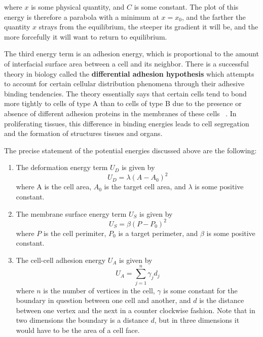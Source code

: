 where $x$ is some physical quantity, and $C$ is some constant. The plot of this energy is therefore a parabola with a minimum at $x =  x_0$, and the farther the quantity $x$ strays from the equilibrium, the steeper its gradient it will be, and the more forcefully it will want to return to equilibrium.

The third energy term is an adhesion energy, which is proportional to the amount of interfacial surface area between a cell and its neighbor. There is a successful theory in biology called the \textbf{differential adhesion hypothesis} which attempts to account for certain cellular distribution phenomena through their adhesive binding tendencies. The theory essentially says that certain cells tend to bond more tightly to cells of type A than to cells of type B due to the presence or absence of different adhesion proteins in the membranes of these cells ~\cite{DA}. In proliferating tissues, this difference in binding energies leads to cell segregation and the formation of structures tissues and organs. 

The precise statement of the potential energies discussed above are the following:

\begin{enumerate}
\item The deformation energy term $U_D$ is given by \\ 
\begin{equation}
U_D = \lambda(A - A_0)^2
\end{equation}
 where A is the cell area, $A_0$ is the target cell area, and $\lambda$ is some positive constant.
\item The membrane surface energy term $U_S$ is given by
\begin{equation}
U_S = \beta(P - P_0)^2
\end{equation}
 where $P$ is the cell perimiter, $P_0$ is a target perimeter, and $\beta$ is some positive constant.
\item The cell-cell adhesion energy $U_A$ is given by
\begin{equation}U_A = \displaystyle\sum\limits_{j = 1}^{n}\gamma_{j}d_{j}\end{equation}
where $n$ is the number of vertices in the cell, $\gamma$ is some constant for the boundary in question between one cell and another, and $d$ is the distance between one vertex and the next in a counter clockwise fashion. Note that in two dimensions the boundary is a distance $d$, but in three dimensions it would have to be the area of a cell face. 
\end{enumerate}

